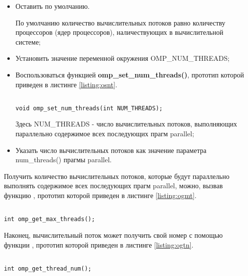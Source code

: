 \begin{itemize}

	\item Оставить по умолчанию.

	По умолчанию количество вычислительных потоков равно количеству процессоров (ядер процессоров), наличествующих в вычислительной системе;

	\item Установить значение переменной окружения OMP\_NUM\_THREADS;

	\item Воспользоваться функцией {\bf omp\_set\_num\_threads()}, прототип которой приведен в листинге \ref{listing:osnt}.

\begin{lstlisting}

void omp_set_num_threads(int NUM_THREADS);

\end{lstlisting}
\mylistingend

	Здесь NUM\_THREADS - число вычислительных потоков, выполняющих параллельно содержимое всех последующих прагм parallel;

	\item Указать число вычислительных потоков как значение параметра num\_threads() прагмы parallel.

\end{itemize}

Получить количество вычислительных потоков, которые будут параллельно выполнять содержимое всех последующих прагм parallel, можно, вызвав функцию , прототип которой приведен в листинге \ref{listing:ogmt}.

\begin{lstlisting}

int omp_get_max_threads();

\end{lstlisting}
\mylistingend

Наконец, вычислительный поток может получить свой номер с помощью функции , прототип которой приведен в листинге \ref{listing:ogtn}.

\begin{lstlisting}

int omp_get_thread_num();

\end{lstlisting}
\mylistingend

